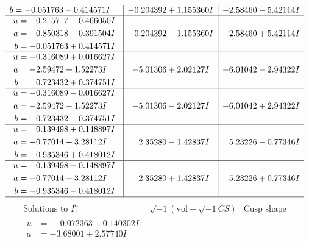 \documentclass[1p]{elsarticle_modified}
\theoremstyle{definition}
\newcommand{\I}{\sqrt{-1}}
\begin{document}
$$\begin{array}{c|c|c}
\begin{aligned}
b &= -0.051763 - 0.414571 I\end{aligned}
 & -0.204392 + 1.155360 I & -2.58460 - 5.42114 I \\ \hline\begin{aligned}
u &= -0.215717 - 0.466050 I \\
a &= \phantom{-}0.850318 - 0.391504 I \\
b &= -0.051763 + 0.414571 I\end{aligned}
 & -0.204392 - 1.155360 I & -2.58460 + 5.42114 I \\ \hline\begin{aligned}
u &= -0.316089 + 0.016627 I \\
a &= -2.59472 + 1.52273 I \\
b &= \phantom{-}0.723432 + 0.374751 I\end{aligned}
 & -5.01306 + 2.02127 I & -6.01042 - 2.94322 I \\ \hline\begin{aligned}
u &= -0.316089 - 0.016627 I \\
a &= -2.59472 - 1.52273 I \\
b &= \phantom{-}0.723432 - 0.374751 I\end{aligned}
 & -5.01306 - 2.02127 I & -6.01042 + 2.94322 I \\ \hline\begin{aligned}
u &= \phantom{-}0.139498 + 0.148897 I \\
a &= -0.77014 - 3.28112 I \\
b &= -0.935346 + 0.418012 I\end{aligned}
 & \phantom{-}2.35280 - 1.42837 I & \phantom{-}5.23226 - 0.77346 I \\ \hline\begin{aligned}
u &= \phantom{-}0.139498 - 0.148897 I \\
a &= -0.77014 + 3.28112 I \\
b &= -0.935346 - 0.418012 I\end{aligned}
 & \phantom{-}2.35280 + 1.42837 I & \phantom{-}5.23226 + 0.77346 I\\
 \hline 
 \end{array}$$\newpage$$\begin{array}{c|c|c}  
\text{Solutions to }I^u_{1}& \I (\text{vol} + \sqrt{-1}CS) & \text{Cusp shape}\\
 \hline 
\begin{aligned}
u &= \phantom{-}0.072363 + 0.140302 I \\
a &= -3.68001 + 2.57740 I \\

\end{aligned}
\end{array}$$
\end{document}

